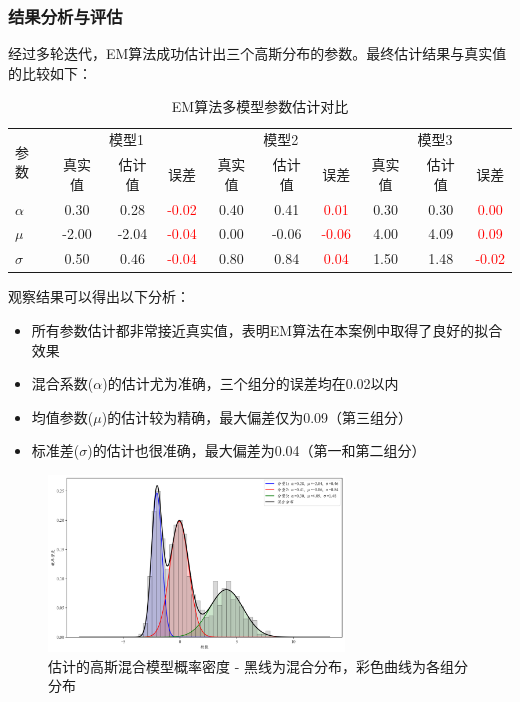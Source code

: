 \documentclass[a4paper,12pt]{ctexart} %
\begin{document}
\subsubsection{结果分析与评估}

经过多轮迭代，EM算法成功估计出三个高斯分布的参数。最终估计结果与真实值的比较如下：
\begin{table}[H]
    \centering
    \caption{EM算法多模型参数估计对比}
    \begin{tabular}{l *{9}{c}}
    \toprule
    \multirow{2}{*}{参数} & 
    \multicolumn{3}{c}{模型1} & 
    \multicolumn{3}{c}{模型2} & 
    \multicolumn{3}{c}{模型3} \\
    \cmidrule(lr){2-4} \cmidrule(lr){5-7} \cmidrule(lr){8-10}
     & 真实值 & 估计值 & 误差 & 真实值 & 估计值 & 误差 & 真实值 & 估计值 & 误差 \\
    \midrule
    $\alpha$ & 
    0.30 & 0.28 & \textcolor{red}{-0.02} & 
    0.40 & 0.41 & \textcolor{red}{0.01} & 
    0.30 & 0.30 & \textcolor{red}{0.00} \\
    
    $\mu$ & 
    -2.00 & -2.04 & \textcolor{red}{-0.04} & 
    0.00 & -0.06 & \textcolor{red}{-0.06} & 
    4.00 & 4.09 & \textcolor{red}{0.09} \\
    
    $\sigma$ & 
    0.50 & 0.46 & \textcolor{red}{-0.04} & 
    0.80 & 0.84 & \textcolor{red}{0.04} & 
    1.50 & 1.48 & \textcolor{red}{-0.02} \\
    \bottomrule
    \end{tabular}
\end{table}

观察结果可以得出以下分析：
\begin{itemize}
    \item 所有参数估计都非常接近真实值，表明EM算法在本案例中取得了良好的拟合效果
    \item 混合系数($\alpha$)的估计尤为准确，三个组分的误差均在0.02以内
    \item 均值参数($\mu$)的估计较为精确，最大偏差仅为0.09（第三组分）
    \item 标准差($\sigma$)的估计也很准确，最大偏差为0.04（第一和第二组分）
\end{itemize}

\begin{figure}[htbp]
    \centering
    \includegraphics[width=0.7\textwidth]{fig/gmm_density.png}
    \caption{估计的高斯混合模型概率密度 - 黑线为混合分布，彩色曲线为各组分分布}
    \label{fig:gmm_density}
\end{figure}
\end{document}
